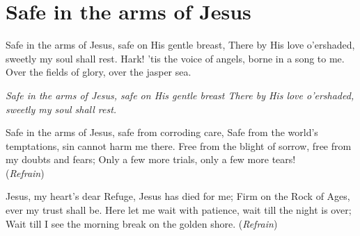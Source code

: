 \starttocol
\chapter{Safe in the arms of Jesus}
\nexttocol
\hfill{\it }
\stoptocol
\startlines
{\sc Safe} in the arms of Jesus, safe on His gentle breast,
There by His love o'ershaded, sweetly my soul shall rest.
Hark! 'tis the voice of angels, borne in a song to me.
Over the fields of glory, over the jasper sea.

{\it Safe in the arms of Jesus, safe on His gentle breast
There by His love o'ershaded, sweetly my soul shall rest.}

Safe in the arms of Jesus, safe from corroding care,
Safe from the world's temptations, sin cannot harm me there.
Free from the blight of sorrow, free from my doubts and fears;
Only a few more trials, only a few more tears!
          \hfill({\it Refrain})~~~~~~~~~

Jesus, my heart's dear Refuge, Jesus has died for me;
Firm on the Rock of Ages, ever my trust shall be.
Here let me wait with patience, wait till the night is over;
Wait till I see the morning break on the golden shore.
          \hfill({\it Refrain})~~~~~~~~~

\stoplines
